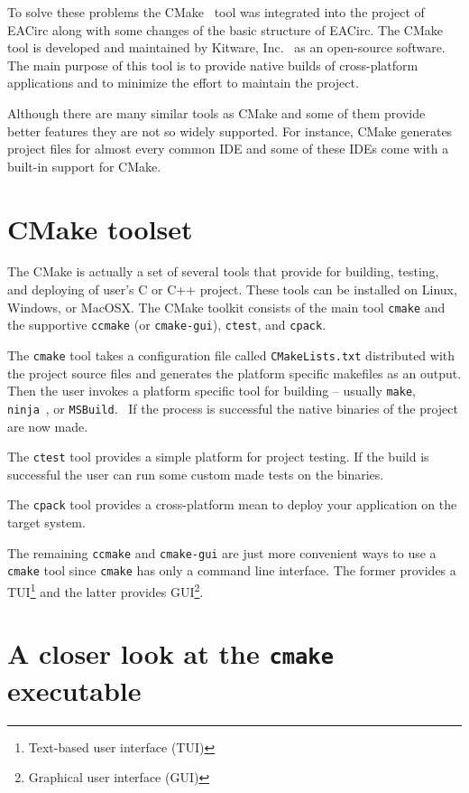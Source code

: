 \documentclass[12pt,oneside]{fithesis2}
\begin{document}
To solve these problems the CMake~\cite{cmake} tool was integrated into the project of EACirc along with some changes of the basic structure of EACirc. The CMake tool is developed and maintained by Kitware, Inc.~\cite{kitware} as an open-source software. The main purpose of this tool is to provide native builds of cross-platform applications and to minimize the effort to maintain the project.

Although there are many similar tools as CMake and some of them provide better features they are not so widely supported. For instance, CMake generates project files for almost every common IDE and some of these IDEs come with a built-in support for CMake.

\section{CMake toolset}

The CMake is actually a set of several tools that provide for building, testing, and deploying of user's C or C++ project. These tools can be installed on Linux, Windows, or MacOSX. The CMake toolkit consists of the main tool \texttt{cmake} and the supportive \texttt{ccmake} (or \texttt{cmake-gui}), \texttt{ctest}, and \texttt{cpack}.~\cite{cmake_docs}

The \texttt{cmake} tool takes a configuration file called \texttt{CMakeLists.txt} distributed with the project source files and generates the platform specific makefiles as an output. Then the user invokes a platform specific tool for building -- usually \texttt{make}, \texttt{ninja}~\cite{ninja}, or \texttt{MSBuild}.~\cite{msbuild} If the process is successful the native binaries of the project are now made.

The \texttt{ctest} tool provides a simple platform for project testing. If the build is successful the user can run some custom made tests on the binaries.

The \texttt{cpack} tool provides a cross-platform mean to deploy your application on the target system.

The remaining \texttt{ccmake} and \texttt{cmake-gui} are just more convenient ways to use a \texttt{cmake} tool since \texttt{cmake} has only a command line interface. The former provides a TUI\footnote{Text-based user interface (TUI)} and the latter provides GUI\footnote{Graphical user interface (GUI)}.

\section{A closer look at the \texttt{cmake} executable}
\end{document}
